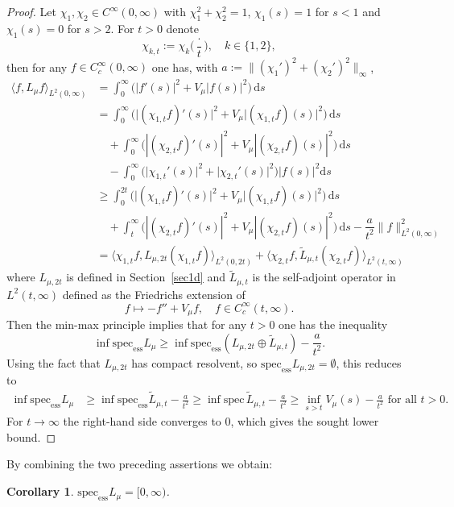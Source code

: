 \documentclass[11pt,oneside,reqno,a4paper]{amsart}
\renewcommand{\Tilde}{\widetilde}
\newcommand{\dd}{\mathrm{d}}
\newcommand{\specess}{\mathrm{spec}_{\mathrm{ess}}}
\newcommand{\spec}{\mathrm{spec}}
\newtheorem{corollary}[theorem]{Corollary}
\theoremstyle{definition}
\begin{document}
\begin{proof}
Let $\chi_1,\chi_2\in C^\infty(0,\infty)$ with $\chi_1^2+\chi_2^2=1$, $\chi_1(s)=1$ for $s<1$ and $\chi_1(s)=0$ for $s>2$.
For $t>0$ denote
\[
\chi_{k,t}:=\chi_k\Big(\dfrac{\cdot}{t}\Big),\quad k\in\{1,2\},
\]
then for any $f\in C^\infty_c(0,\infty)$ one has, with $a:=\big\|(\chi_1')^2+(\chi_2')^2\big\|_\infty$,
\begin{align*}
	\langle f,L_\mu f\rangle_{L^2(0,\infty)}&=\int_0^\infty \big( |f'(s)|^2+V_\mu |f(s)|^2\big)\,\dd s\\
	&=\int_0^\infty \big( \big|(\chi_{1,t}f)'(s)\big|^2+V_\mu \big|(\chi_{1,t}f)(s)\big|^2\big)\,\dd s\\
	&\quad +\int_0^\infty \Big( |(\chi_{2,t}f)'(s)|^2+V_\mu |(\chi_{2,t}f)(s)|^2\big)\,\dd s\\
	&\quad -\int_0^\infty \Big(\big|\chi_{1,t}'(s)\big|^2+\big|\chi_{2,t}'(s)\big|^2\Big)\big|f(s)\big|^2\dd s	\\
	&\ge \int_0^{2t} \big( \big|(\chi_{1,t}f)'(s)\big|^2+V_\mu \big|(\chi_{1,t}f)(s)\big|^2\big)\,\dd s\\
	&\quad +\int_t^\infty \Big( |(\chi_{2,t}f)'(s)|^2+V_\mu |(\chi_{2,t}f)(s)|^2\big)\,\dd s
	-\dfrac{a}{t^2}\|f\|^2_{L^2(0,\infty)}\\
	&=\Big\langle \chi_{1,t}f, L_{\mu,2t}(\chi_{1,t}f)\Big\rangle_{L^2(0,2t)}+
	\Big\langle \chi_{2,t}f, \Tilde L_{\mu,t}(\chi_{2,t}f)\Big\rangle_{L^2(t,\infty)}
\end{align*}
where $L_{\mu,2t}$ is defined in Section~\ref{sec1d} and $\Tilde L_{\mu,t}$ is the self-adjoint operator in $L^2(t,\infty)$
defined as the Friedrichs extension of
\[
f\mapsto -f''+V_\mu f,\quad f\in C^\infty_c(t,\infty).
\]
Then the min-max principle implies that for any $t>0$ one has the inequality
\[
\inf \specess L_\mu\ge \inf\specess (L_{\mu,2t}\oplus\Tilde L_{\mu,t})-\frac{a}{t^2}.
\]
Using the fact that $L_{\mu,2t}$ has compact resolvent, so $\specess L_{\mu,2t}=\emptyset$, this reduces to
\begin{align*}
\inf \specess L_\mu&\ge \inf\specess \Tilde L_{\mu,t}-\frac{a}{t^2}
\ge \inf\spec \,\Tilde L_{\mu,t}-\frac{a}{t^2}\ge \inf_{s> t} V_\mu(s)-\frac{a}{t^2} \text{ for all } t>0.
\end{align*}
For $t\to\infty$ the right-hand side converges to $0$, which gives the sought lower bound.
\end{proof}

By combining the two preceding assertions we obtain:
\begin{corollary} $\specess L_\mu=[0,\infty)$.
\end{corollary}
\end{document}

